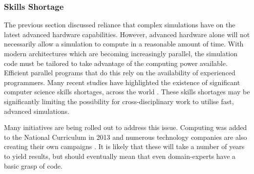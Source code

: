 \documentclass{UoYCSproject}
\begin{document}



\subsubsection{Skills Shortage}
\label{skills_shortage}
The previous section discussed reliance that complex simulations have on the latest advanced hardware capabilities.
However, advanced hardware alone will not necessarily allow a simulation to compute in a reasonable amount of time. 
With modern architectures which are becoming increasingly parallel, the simulation code must be tailored to take advantage of the computing power available.
Efficient parallel programs that do this rely on the availability of experienced programmers.
Many recent studies have highlighted the existence of significant computer science skills shortages, across the world \cite{digital_skills_uk, microsoft_blog}.
These skills shortages may be significantly limiting the possibility for cross-disciplinary work to utilise fast, advanced simulations.



Many initiatives are being rolled out to address this issue.
Computing was added to the National Curriculum in 2013 \cite{national_curriculum, teacher_training} and numerous technology companies are also creating their own campaigns \cite{apple_education, microsoft_education}.
It is likely that these will take a number of years to yield results, but should eventually mean that even domain-experts have a basic grasp of code.
\end{document}
